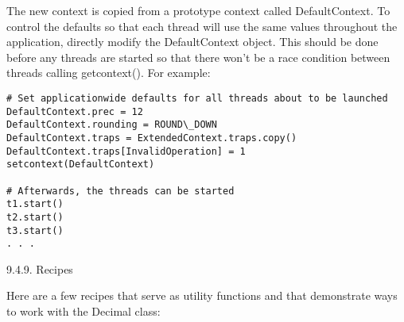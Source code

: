 The new context is copied from a prototype context called DefaultContext. To control the defaults so that each thread will use the same values throughout the application, directly modify the DefaultContext object. This should be done before any threads are started so that there won’t be a race condition between threads calling getcontext(). For example:

\begin{lstlisting}
# Set applicationwide defaults for all threads about to be launched
DefaultContext.prec = 12
DefaultContext.rounding = ROUND\_DOWN
DefaultContext.traps = ExtendedContext.traps.copy()
DefaultContext.traps[InvalidOperation] = 1
setcontext(DefaultContext)

# Afterwards, the threads can be started
t1.start()
t2.start()
t3.start()
. . .
\end{lstlisting}


9.4.9. Recipes

Here are a few recipes that serve as utility functions and that demonstrate ways to work with the Decimal class:

